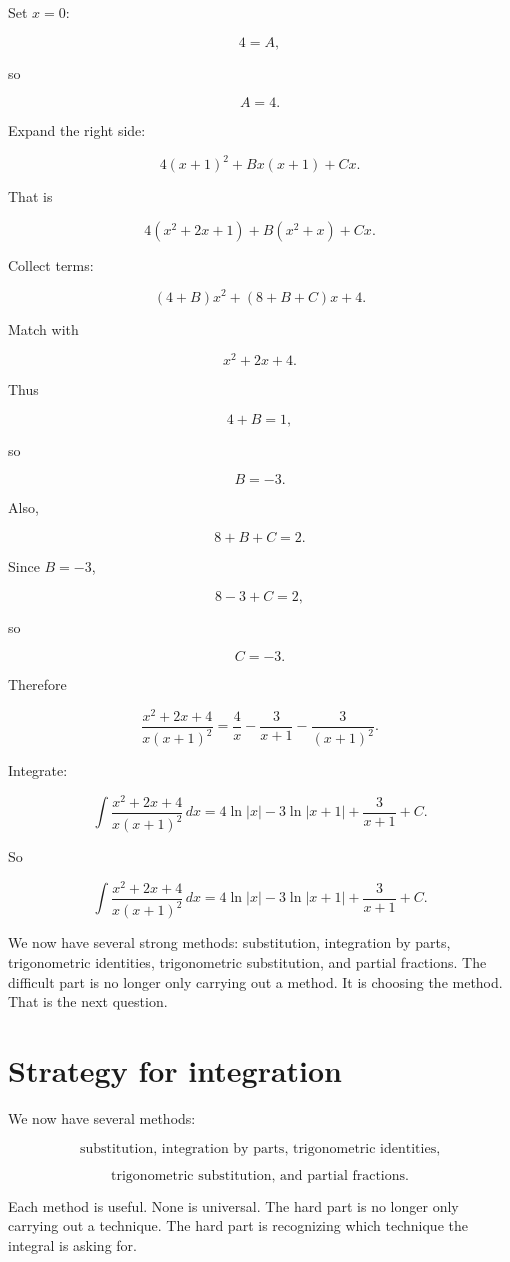 Set \(x=0\):

\[
4=A,
\]

so

\[
A=4.
\]

Expand the right side:

\[
4(x+1)^2+Bx(x+1)+Cx.
\]

That is

\[
4(x^2+2x+1)+B(x^2+x)+Cx.
\]

Collect terms:

\[
(4+B)x^2+(8+B+C)x+4.
\]

Match with

\[
x^2+2x+4.
\]

Thus

\[
4+B=1,
\]

so

\[
B=-3.
\]

Also,

\[
8+B+C=2.
\]

Since \(B=-3\),

\[
8-3+C=2,
\]

so

\[
C=-3.
\]

Therefore

\[
\frac{x^2+2x+4}{x(x+1)^2}
=
\frac{4}{x}
-
\frac{3}{x+1}
-
\frac{3}{(x+1)^2}.
\]

Integrate:

\[
\int \frac{x^2+2x+4}{x(x+1)^2}\,dx
=
4\ln|x|
-
3\ln|x+1|
+
\frac{3}{x+1}
+C.
\]

So

\[
\boxed{
\int \frac{x^2+2x+4}{x(x+1)^2}\,dx
=
4\ln|x|
-
3\ln|x+1|
+
\frac{3}{x+1}
+C.
}
\]

We now have several strong methods: substitution, integration by parts, trigonometric
identities, trigonometric substitution, and partial fractions.  The difficult part is no
longer only carrying out a method.  It is choosing the method.  That is the next question.
\section{Strategy for integration}
\label{sec:strategy-for-integration}

We now have several methods:

\[
\text{substitution, integration by parts, trigonometric identities,}
\]

\[
\text{trigonometric substitution, and partial fractions.}
\]

Each method is useful.  None is universal.  The hard part is no longer only carrying out
a technique.  The hard part is recognizing which technique the integral is asking for.

